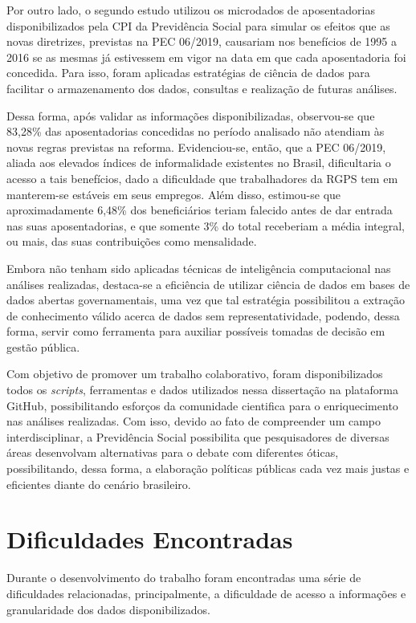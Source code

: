 Por outro lado, o segundo estudo utilizou os microdados de aposentadorias disponibilizados pela CPI da Previdência Social para simular os efeitos que as novas diretrizes, previstas na PEC 06/2019, causariam nos benefícios de 1995 a 2016 se as mesmas já estivessem em vigor na data em que cada aposentadoria foi concedida. Para isso, foram aplicadas estratégias de ciência de dados para facilitar o armazenamento dos dados, consultas e realização de futuras análises. 

Dessa forma, após validar as informações disponibilizadas, observou-se que 83,28\% das aposentadorias concedidas no período analisado não atendiam às novas regras previstas na reforma. Evidenciou-se, então, que a PEC 06/2019, aliada aos elevados índices de informalidade existentes no Brasil, dificultaria o acesso a tais benefícios, dado a dificuldade que trabalhadores da RGPS tem em manterem-se estáveis em seus empregos. Além disso, estimou-se que aproximadamente 6,48\% dos beneficiários teriam falecido antes de dar entrada nas suas aposentadorias, e que somente 3\% do total receberiam a média integral, ou mais, das suas contribuições como mensalidade.

Embora não tenham sido aplicadas técnicas de inteligência computacional nas análises realizadas, destaca-se a eficiência de utilizar ciência de dados em bases de dados abertas governamentais, uma vez que tal estratégia possibilitou a extração de conhecimento válido acerca de dados sem representatividade, podendo, dessa forma, servir como ferramenta para auxiliar possíveis tomadas de decisão em gestão pública. 

Com objetivo de promover um trabalho colaborativo, foram disponibilizados todos os \textit{scripts}, ferramentas e dados utilizados nessa dissertação na plataforma GitHub, possibilitando esforços da comunidade cientifica para o enriquecimento nas análises realizadas. Com isso, devido ao fato de compreender um campo interdisciplinar, a Previdência Social possibilita que pesquisadores de diversas áreas desenvolvam alternativas para o debate com diferentes óticas, possibilitando, dessa forma, a elaboração políticas públicas cada vez mais justas e eficientes diante do cenário brasileiro.

\section{Dificuldades Encontradas}

Durante o desenvolvimento do trabalho foram encontradas uma série de dificuldades relacionadas, principalmente, a dificuldade de acesso a informações e granularidade dos dados disponibilizados.

